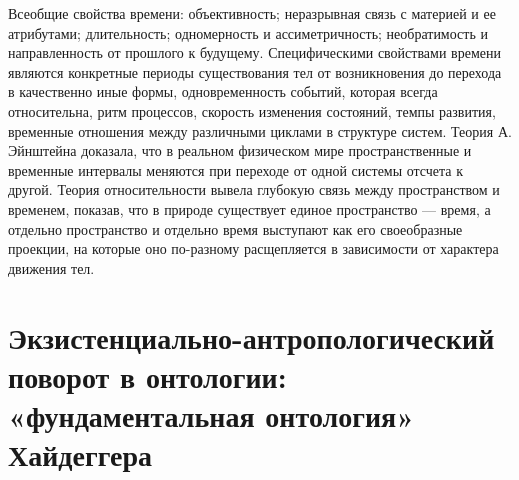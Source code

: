 \documentclass[12pt]{article}
\begin{document}
Всеобщие свойства времени: объективность; неразрывная связь с материей и ее атрибутами; длительность;
одномерность и ассиметричность; необратимость и направленность от прошлого к будущему.
Специфическими свойствами времени являются конкретные периоды существования тел от возникновения до
перехода в качественно иные формы, одновременность событий, которая всегда относительна, ритм процессов,
скорость изменения состояний, темпы развития, временные отношения между различными циклами в структуре
систем.
Теория А. Эйнштейна доказала, что в реальном физическом мире пространственные и временные интервалы
меняются при переходе от одной системы отсчета к другой.
Теория относительности вывела глубокую связь между пространством и временем, показав, что в природе
существует единое пространство — время, а отдельно пространство и отдельно время выступают как его
своеобразные проекции, на которые оно по-разному расщепляется в зависимости от характера движения тел. 


\newpage
\section{Экзистенциально-антропологический поворот в онтологии: «фундаментальная онтология» Хайдеггера}
\end{document}
